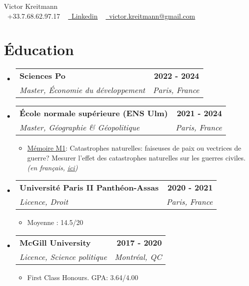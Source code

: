 \documentclass[a4paper,11pt]{article}
\makeatletter
\newcommand{\resumeItem}[1]{
  \item\small{
    {#1 \vspace{-2pt}}
  }
}
\newcommand{\resumeSubheading}[4]{
  \vspace{-2pt}\item
    \begin{tabular*}{1.00\textwidth}[t]{l@{\extracolsep{\fill}}r}
      \textbf{{\small #1}} & {\textbf{\small #2}} \\
      \textit{\small#3} & \textit{\small #4} \\
    \end{tabular*}\vspace{-7pt}
}
\newcommand{\resumeSubHeadingListStart}{\begin{itemize}[leftmargin=0.0in, label={}]}
\newcommand{\resumeSubHeadingListEnd}{\end{itemize}}
\newcommand{\resumeItemListStart}{\begin{itemize}}
\newcommand{\resumeItemListEnd}{\end{itemize}\vspace{-5pt}}
\makeatother
\begin{document}

\begin{center}
    {\Huge \upshape Victor Kreitmann} \\ \vspace{1pt}
    \small \raisebox{-0.1\height}\faPhone\ +33.7.68.62.97.17 ~
    \href{https://www.linkedin.com/in/victor-kreitmann/}{\raisebox{-0.2\height}\faLinkedin\ \underline{Linkedin}}  ~    
    \href{mailto:victor.kreitmann@gmail.com}{\raisebox{-0.2\height}\faEnvelope\  \underline{victor.kreitmann@gmail.com}} ~ 
    \vspace{0pt}
\end{center}




\section{Éducation}
  \resumeSubHeadingListStart
    \resumeSubheading
      {Sciences Po}{2022 - 2024}
      {Master, Économie du développement}{Paris, France}
      
      \resumeSubheading
      {École normale supérieure (ENS Ulm)}{2021 - 2024}
      {Master, Géographie \& Géopolitique}{Paris, France}
      \resumeItemListStart
      \resumeItem{\underline{Mémoire M1}: Catastrophes naturelles: faiseuses de paix ou vectrices de guerre? Mesurer l'effet des catastrophes naturelles sur les guerres civiles.\emph{(en français, \href{https://drive.google.com/file/d/1O6ke_2wZjExpSnBBnSKN7shPb0E3ZBgg/view?usp=sharing}{\underline{ici}})}}
      \resumeItemListEnd
      
      \resumeSubheading
      {Université Paris II Panthéon-Assas}{2020 - 2021}
      {Licence, Droit}{Paris, France}
      \resumeItemListStart
      \resumeItem{Moyenne : 14.5/20}
      \resumeItemListEnd
      
      \resumeSubheading
      {McGill University}{2017 - 2020}
      {Licence, Science politique}{Montréal, QC}
      \resumeItemListStart
      \resumeItem{First Class Honours. GPA: 3.64/4.00}
      \resumeItemListEnd
  \resumeSubHeadingListEnd
\vspace{-10pt}
\end{document}
